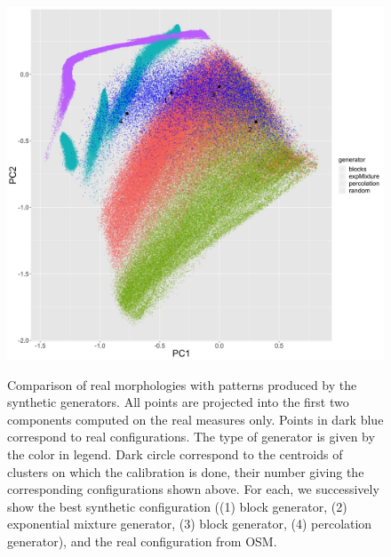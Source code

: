 \documentclass[letterpaper]{article}
\begin{document}
\begin{figure}
    \\
    \includegraphics[width=\linewidth]{lhscalib_projrealpcs}
    \caption{Comparison of real morphologies with patterns produced by the synthetic generators. All points are projected into the first two components computed on the real measures only. Points in dark blue correspond to real configurations. The type of generator is given by the color in legend. Dark circle correspond to the centroids of clusters on which the calibration is done, their number giving the corresponding configurations shown above. For each, we successively show the best synthetic configuration ((1) block generator, (2) exponential mixture generator, (3) block generator, (4) percolation generator), and the real configuration from OSM.}
    \label{fig:lhs}
\end{figure}



\end{document}
